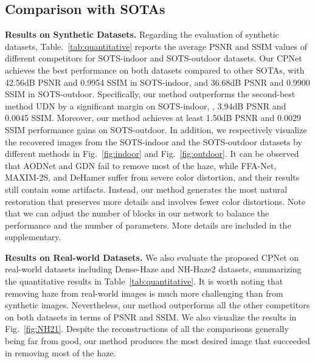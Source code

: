 \subsection{Comparison with SOTAs}
\textbf{Results on Synthetic Datasets.}
Regarding the evaluation of synthetic datasets, Table.~\ref{tab:quantitative} reports the average PSNR and SSIM values of different competitors for SOTS-indoor and SOTS-outdoor datasets. Our CPNet achieves the best performance on both datasets compared to other SOTAs, with 42.56dB PSNR and 0.9954 SSIM in SOTS-indoor, and 36.68dB PSNR and 0.9900 SSIM in SOTS-outdoor. Specifically, our method outperforms the second-best method UDN by a significant margin on SOTS-indoor, \ie, 3.94dB PSNR and 0.0045 SSIM. Moreover, our method achieves at least 1.50dB PSNR and 0.0029 SSIM performance gains on SOTS-outdoor. In addition, we respectively visualize the recovered images from the SOTS-indoor and the SOTS-outdoor datasets by different methods in Fig.~\ref{fig:indoor} and Fig.~\ref{fig:outdoor}. It can be observed that AODNet and GDN fail to remove most of the haze, while FFA-Net, MAXIM-2S, and DeHamer suffer from severe color distortion, and their results still contain some artifacts. Instead, our method generates the most natural restoration that preserves more details and involves fewer color distortions. Note that we can adjust the number of blocks in our network to balance the performance and the number of parameters. More details are included in the supplementary.


\textbf{Results on Real-world Datasets.}
We also evaluate the proposed CPNet on real-world datasets including Dense-Haze and NH-Haze2 datasets, summarizing the quantitative results in Table~\ref{tab:quantitative}. It is worth noting that removing haze from real-world images is much more challenging than from synthetic images. Nevertheless, our method outperforms all the other competitors on both datasets in terms of PSNR and SSIM. We also visualize the results in Fig.~\ref{fig:NH21}. Despite the reconstructions of all the comparisons generally being far from good, our method produces the most desired image that succeeded in removing most of the haze. 

